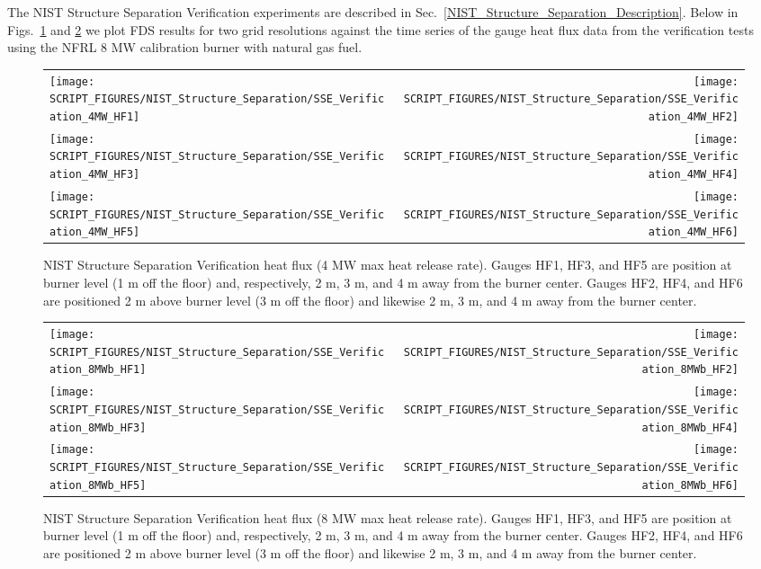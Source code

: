 The NIST Structure Separation Verification experiments are described in Sec.~\ref{NIST_Structure_Separation_Description}.  Below in Figs.~\ref{NIST_SSE_Verification_HF_4MW} and \ref{NIST_SSE_Verification_HF_8MW} we plot FDS results for two grid resolutions against the time series of the gauge heat flux data from the verification tests using the NFRL 8 MW calibration burner with natural gas fuel.

\begin{figure}[!ht]
\begin{tabular*}{\textwidth}{l@{\extracolsep{\fill}}r}
\texttt{[image: SCRIPT\_FIGURES/NIST\_Structure\_Separation/SSE\_Verification\_4MW\_HF1]} &
\texttt{[image: SCRIPT\_FIGURES/NIST\_Structure\_Separation/SSE\_Verification\_4MW\_HF2]} \\
\texttt{[image: SCRIPT\_FIGURES/NIST\_Structure\_Separation/SSE\_Verification\_4MW\_HF3]} &
\texttt{[image: SCRIPT\_FIGURES/NIST\_Structure\_Separation/SSE\_Verification\_4MW\_HF4]} \\
\texttt{[image: SCRIPT\_FIGURES/NIST\_Structure\_Separation/SSE\_Verification\_4MW\_HF5]} &
\texttt{[image: SCRIPT\_FIGURES/NIST\_Structure\_Separation/SSE\_Verification\_4MW\_HF6]}
\end{tabular*}
\caption[NIST Structure Separation Verification heat flux (4 MW)]
{NIST Structure Separation Verification heat flux (4 MW max heat release rate).  Gauges HF1, HF3, and HF5 are position at burner level (1 m off the floor) and, respectively, 2 m, 3 m, and 4 m away from the burner center.  Gauges HF2, HF4, and HF6 are positioned 2 m above burner level (3 m off the floor) and likewise 2 m, 3 m, and 4 m away from the burner center.}
\label{NIST_SSE_Verification_HF_4MW}
\end{figure}

\begin{figure}[!ht]
\begin{tabular*}{\textwidth}{l@{\extracolsep{\fill}}r}
\texttt{[image: SCRIPT\_FIGURES/NIST\_Structure\_Separation/SSE\_Verification\_8MWb\_HF1]} &
\texttt{[image: SCRIPT\_FIGURES/NIST\_Structure\_Separation/SSE\_Verification\_8MWb\_HF2]} \\
\texttt{[image: SCRIPT\_FIGURES/NIST\_Structure\_Separation/SSE\_Verification\_8MWb\_HF3]} &
\texttt{[image: SCRIPT\_FIGURES/NIST\_Structure\_Separation/SSE\_Verification\_8MWb\_HF4]} \\
\texttt{[image: SCRIPT\_FIGURES/NIST\_Structure\_Separation/SSE\_Verification\_8MWb\_HF5]} &
\texttt{[image: SCRIPT\_FIGURES/NIST\_Structure\_Separation/SSE\_Verification\_8MWb\_HF6]}
\end{tabular*}
\caption[NIST Structure Separation Verification heat flux (8 MW)]
{NIST Structure Separation Verification heat flux (8 MW max heat release rate).  Gauges HF1, HF3, and HF5 are position at burner level (1 m off the floor) and, respectively, 2 m, 3 m, and 4 m away from the burner center.  Gauges HF2, HF4, and HF6 are positioned 2 m above burner level (3 m off the floor) and likewise 2 m, 3 m, and 4 m away from the burner center.}
\label{NIST_SSE_Verification_HF_8MW}
\end{figure}

